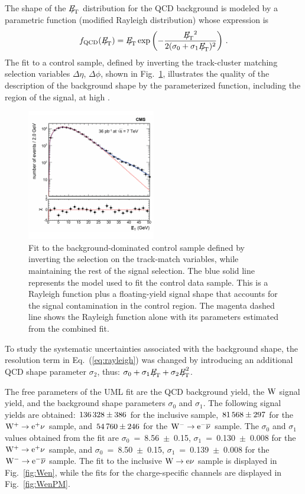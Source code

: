 The shape of the ${E\!\!\!/}_{\!\mathrm{T}}$ distribution for the QCD background is modeled by a parametric function (modified Rayleigh
distribution) whose expression is
\begin{equation}
f_{\mathrm{QCD}}(\MET) = \MET\exp\left(-\frac{\MET{^2}}{2(\sigma_0+\sigma_1 \MET)^{2}}\right)\,.
\label{eq:rayleigh}
\end{equation}
The fit to a control sample, defined by inverting the track-cluster matching selection
variables $\Delta\eta$, $\Delta\phi$, shown in Fig.~\ref{fig:e-inverted}, illustrates
the quality of the description of the background shape by the parameterized function,
including the region of the signal, at high \MET.
\begin{figure}[htbp]
\begin{center}
\includegraphics[width=0.50\textwidth]{figs/fixedMCyield_normal_model.pdf}
\caption{Fit to the background-dominated control sample defined by inverting
the selection on the track-match variables,
while maintaining the rest of the signal selection.
The blue solid line represents the model used to fit the control data sample. This is a Rayleigh
function plus a floating-yield signal shape that accounts for the signal contamination in the
control region. The magenta dashed line shows the Rayleigh function alone with its parameters estimated
from the combined fit.
}\label{fig:e-inverted}
\end{center}
\end{figure}
To study the systematic uncertainties associated with the background shape, the resolution term in
Eq.~(\ref{eq:rayleigh}) was changed by introducing an additional QCD shape parameter $\sigma_2$,
thus: $\sigma_0 + \sigma_1 \MET + \sigma_2 \MET^2$.

The free parameters of the UML fit are the QCD background yield,
the $\mathrm{W}$ signal yield, and the background shape
parameters $\sigma_0$ and $\sigma_1$.
The following signal yields are obtained:
$ 136\,328 \pm 386   $ for the inclusive sample, $  81\,568 \pm 297   $ for the $\mathrm{W^+} \rightarrow \mathrm{e}^+\nu$ sample, and
$  54\,760 \pm 246   $ for the $\mathrm{W^-} \rightarrow \mathrm{e}^-\overline{\nu}$ sample. 
The $\sigma_0$ and $\sigma_1$ values obtained from the fit are   
$\sigma_0$~=~8.56~$\pm$~0.15, $\sigma_1$~=~0.130~$\pm$~0.008 
for the $\mathrm{W^+} \rightarrow \mathrm{e}^+\nu$ sample, and $\sigma_0$~=~8.50~$\pm$~0.15, $\sigma_1$~=~0.139~$\pm$~0.008
for the $\mathrm{W^-} \rightarrow \mathrm{e}^-\overline{\nu}$ sample. 
The fit to the inclusive $\mathrm{W} \rightarrow \mathrm{e}\nu$ sample is displayed
in Fig.~\ref{fig:Wen}, while the fits for the charge-specific
channels are displayed in Fig.~\ref{fig:WenPM}.

